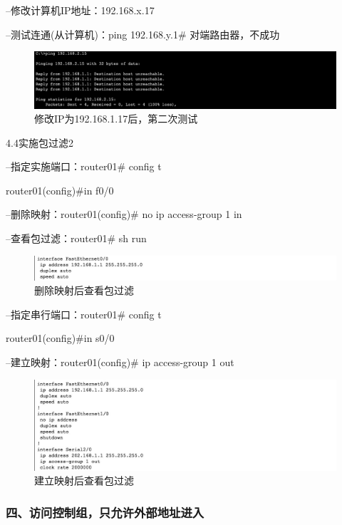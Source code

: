 \documentclass[lang=cn,11pt,a4paper,cite=authoryear]{elegantpaper}
\begin{document}
--修改计算机IP地址：192.168.x.17

--测试连通(从计算机)：ping 192.168.y.1\# 对端路由器，不成功

\begin{figure}[htbp]
	\centering
	\includegraphics[width=0.7\linewidth]{image/screenshot036}
	\caption{修改IP为192.168.1.17后，第二次测试}
	\label{fig:screenshot036}
\end{figure}


4.4实施包过滤2

--指定实施端口：router01\# config t

router01(config)\#in f0/0

--删除映射：router01(config)\# no ip access-group 1 in 

--查看包过滤：router01\# sh run

\begin{figure}[htbp]
	\centering
	\includegraphics[width=0.7\linewidth]{image/screenshot037}
	\caption{删除映射后查看包过滤}
	\label{fig:screenshot037}
\end{figure}


--指定串行端口：router01\# config t

router01(config)\#in s0/0

--建立映射：router01(config)\# ip access-group 1 out


\begin{figure}[htbp]
	\centering
	\includegraphics[width=0.7\linewidth]{image/screenshot038}
	\caption{建立映射后查看包过滤}
	\label{fig:screenshot038}
\end{figure}

\subsubsection{四、访问控制组，只允许外部地址进入}
\end{document}
